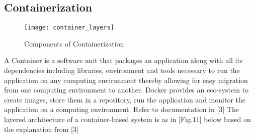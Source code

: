 \subsection{Containerization}

\begin{figure}[h!]
    \centering
    \texttt{[image: container\_layers]}
    \label{fig:10}
    \caption{Components of Containerization \protect\cite{docker}}
\end{figure}

\begin{flushleft}
A Container is a software unit that packages an application along with all its dependencies including libraries, environment and tools necessary to run the application on any computing environment thereby allowing for easy migration from one computing environment to another. Docker provides an eco-system to create images, store them in a repository, run the application and monitor the application on a computing environment. Refer to documentation in [3]
The layered architecture of a container-based system is as in [Fig.11] below based on the explanation from [3]
\end{flushleft}


